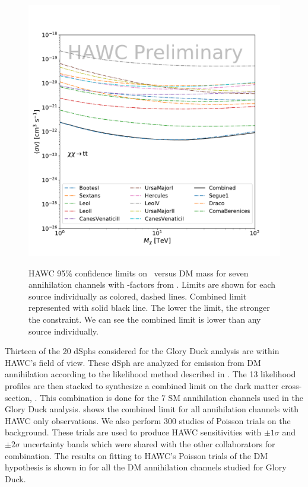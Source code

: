 \begin{figure}[ht]
{    \includegraphics[scale=0.215]{figures/glory_duck/hawc/Combined95_GD_tt.pdf}
    }
    \caption{HAWC 95\% confidence limits on \sv~versus DM mass for seven annihilation channels with \J-factors from \GS. Limits are shown for each source individually as colored, dashed lines. Combined limit represented with solid black line. The lower the limit, the stronger the constraint. We can see the combined limit is lower than any source individually.}
 \label{fig:hawc_combined_limit}
\end{figure}

Thirteen of the 20 dSphs considered for the Glory Duck analysis are within HAWC's field of view.
These dSph are analyzed for emission from DM annihilation according to the likelihood method described in .
The 13 likelihood profiles are then stacked to synthesize a combined limit on the dark matter cross-section, \sv.
This combination is done for the 7 SM annihilation channels used in the Glory Duck analysis.
 shows the combined limit for all annihilation channels with HAWC only observations.
We also perform 300 studies of Poisson trials on the background.
These trials are used to produce HAWC sensitivities with $\pm1\sigma$ and $\pm2\sigma$ uncertainty bands which were shared with the other collaborators for combination.
The results on fitting to HAWC's Poisson trials of the DM hypothesis is shown in  for all the DM annihilation channels studied for Glory Duck.

